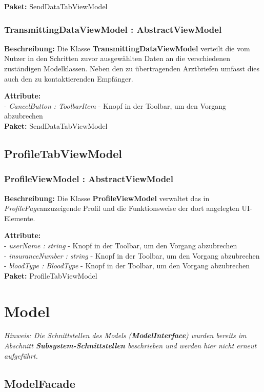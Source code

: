\documentclass[a4paper]{scrreprt}
\begin{document}
\textbf{Paket:} SendDataTabViewModel

\subsubsection{TransmittingDataViewModel : AbstractViewModel}
\textbf{Beschreibung:} Die Klasse \textbf{TransmittingDataViewModel} verteilt die vom Nutzer in den Schritten zuvor ausgewählten Daten an die verschiedenen zuständigen Modelklassen. Neben den zu übertragenden Arztbriefen umfasst dies auch den zu kontaktierenden Empfänger.

\textbf{Attribute:}\\
- \textit{CancelButton : ToolbarItem} - Knopf in der Toolbar, um den Vorgang abzubrechen\\

\textbf{Paket:} SendDataTabViewModel

\subsection{ProfileTabViewModel}
\subsubsection{ProfileViewModel : AbstractViewModel}
\textbf{Beschreibung:} Die Klasse \textbf{ProfileViewModel} verwaltet das in \textit{ProfilePage}anzuzeigende Profil und die Funktionsweise der dort angelegten UI-Elemente.

\textbf{Attribute:}\\
- \textit{userName : string} - Knopf in der Toolbar, um den Vorgang abzubrechen\\
- \textit{insuranceNumber : string} - Knopf in der Toolbar, um den Vorgang abzubrechen\\
- \textit{bloodType : BloodType} - Knopf in der Toolbar, um den Vorgang abzubrechen\\

\textbf{Paket:} ProfileTabViewModel

\section{Model}
\textit{Hinweis: Die Schnittstellen des Models (\textbf{ModelInterface}) wurden bereits im Abschnitt \textbf{Subsystem-Schnittstellen} beschrieben und werden hier nicht erneut aufgeführt.}

\subsection{ModelFacade}
\end{document}
